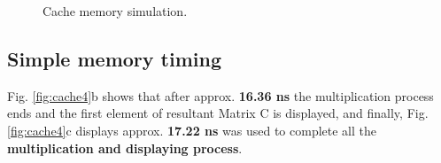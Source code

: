 \documentclass[]{article}
\begin{document}
\begin{figure}[H]
	\centering
	\caption{Cache memory simulation.}
	\label{fig:cache3}
\end{figure}

\subsection{Simple memory timing}
Fig. \ref{fig:cache4}b shows that after approx. \textbf{16.36 ns} the multiplication process ends and the first element of resultant Matrix C is displayed, and finally, Fig. \ref{fig:cache4}c displays approx. \textbf{17.22 ns} was used to complete all the \textbf{multiplication and displaying process}.  
\end{document}
